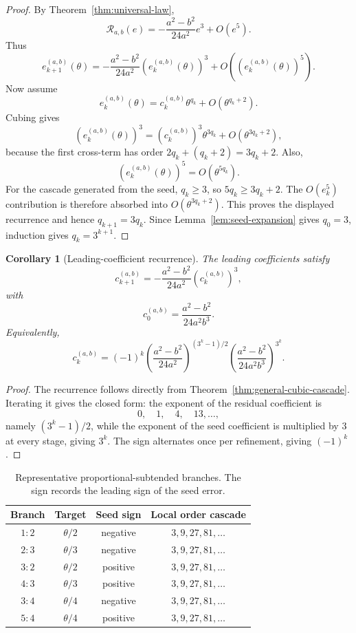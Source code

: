 \documentclass[11pt]{article}
\newtheorem{corollary}[theorem]{Corollary}
\theoremstyle{definition}
\theoremstyle{remark}
\newcommand{\Rop}{\mathscr{R}}
\begin{document}
\begin{proof}
By Theorem~\ref{thm:universal-law},
\[
\Rop_{a,b}(e)
=
-
\frac{a^2-b^2}{24a^2}e^3
+
O(e^5).
\]
Thus
\[
e^{(a,b)}_{k+1}(\theta)
=
-
\frac{a^2-b^2}{24a^2}
\left(e^{(a,b)}_k(\theta)\right)^3
+
O\!\left(\left(e^{(a,b)}_k(\theta)\right)^5\right).
\]
Now assume
\[
e^{(a,b)}_k(\theta)
=
c^{(a,b)}_k\theta^{q_k}
+
O(\theta^{q_k+2}).
\]
Cubing gives
\[
\left(e^{(a,b)}_k(\theta)\right)^3
=
\left(c^{(a,b)}_k\right)^3\theta^{3q_k}
+
O(\theta^{3q_k+2}),
\]
because the first cross-term has order $2q_k+(q_k+2)=3q_k+2$.  Also,
\[
\left(e^{(a,b)}_k(\theta)\right)^5
=
O(\theta^{5q_k}).
\]
For the cascade generated from the seed, $q_k\ge 3$, so $5q_k\ge 3q_k+2$.
The $O(e_k^5)$ contribution is therefore absorbed into
$O(\theta^{3q_k+2})$.  This proves the displayed recurrence and hence
$q_{k+1}=3q_k$.  Since Lemma~\ref{lem:seed-expansion} gives $q_0=3$, induction
gives $q_k=3^{k+1}$.
\end{proof}

\begin{corollary}[Leading-coefficient recurrence]
\label{cor:leading-coefficients}
The leading coefficients satisfy
\[
c^{(a,b)}_{k+1}
=
-
\frac{a^2-b^2}{24a^2}
\left(c^{(a,b)}_k\right)^3,
\]
with
\[
c^{(a,b)}_0
=
\frac{a^2-b^2}{24a^2b^3}.
\]
Equivalently,
\[
c^{(a,b)}_k
=
(-1)^k
\left(
\frac{a^2-b^2}{24a^2}
\right)^{(3^k-1)/2}
\left(
\frac{a^2-b^2}{24a^2b^3}
\right)^{3^k}.
\]
\end{corollary}

\begin{proof}
The recurrence follows directly from
Theorem~\ref{thm:general-cubic-cascade}.  Iterating it gives the closed form:
the exponent of the residual coefficient is
\[
0,\quad 1,\quad 4,\quad 13,\ldots,
\]
namely $(3^k-1)/2$, while the exponent of the seed coefficient is multiplied
by $3$ at every stage, giving $3^k$.  The sign alternates once per refinement,
giving $(-1)^k$.
\end{proof}

\begin{table}[h]
\centering
\begin{tabular}{cccc}
\toprule
Branch & Target & Seed sign & Local order cascade \\
\midrule
$1:2$ & $\theta/2$ & negative & $3,9,27,81,\ldots$ \\
$2:3$ & $\theta/3$ & negative & $3,9,27,81,\ldots$ \\
$3:2$ & $\theta/2$ & positive & $3,9,27,81,\ldots$ \\
$4:3$ & $\theta/3$ & positive & $3,9,27,81,\ldots$ \\
$3:4$ & $\theta/4$ & negative & $3,9,27,81,\ldots$ \\
$5:4$ & $\theta/4$ & positive & $3,9,27,81,\ldots$ \\
\bottomrule
\end{tabular}
\caption{Representative proportional-subtended branches.  The sign records the
leading sign of the seed error.}
\label{tab:representative-branches}
\end{table}
\end{document}
